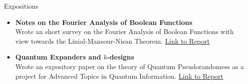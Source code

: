 \documentclass{resume} %
\begin{document}
\begin{rSection}{Expositions}
  \begin{itemize}
    \item {\bf Notes on the Fourier Analysis of Boolean Functions}
    \hfill \\
    Wrote an short survey on the Fourier Analysis of Boolean Functions with view towards the Linial-Mansour-Nisan Theorem.
    \href{https://github.com/ekim1919/Research/blob/master/CS590/EdwardKimPaper.pdf}{Link to Report}
    \item {\bf Quantum Expanders and $k$-designs} \hfill \\
    Wrote an expository paper on the theory of Quantum Pseudorandomess as a project for Advanced Topics in Quantum Information.
    \href{https://github.com/ekim1919/Research/blob/master/PHYS790/final.pdf}{Link to Report}
  \end{itemize}
\end{rSection}
\end{document}

